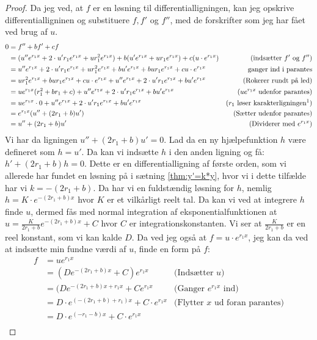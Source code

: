 \begin{proof}
Da jeg ved, at $f$ er en løsning til differentialligningen, kan jeg opskrive differentialligninen og substituere $f, f'$ og $f''$, med de forskrifter som jeg har fået ved brug af $u$. 
\begin{align*}
0 	&= f'' + bf' + cf \\
	&= (u''e^{r_1 x} + 2\cdot u' r_1 e^{r_1 x} + u r_1^2 e^{r_1 x}) + b(u'e^{r_1 x} + ur_1 e^{r_1 x}) + c (u \cdot e^{r_1 x}) &\text{(indsætter $f'$ og $f''$)}\\
	&= u''e^{r_1 x} + 2\cdot u' r_1 e^{r_1 x} + u r_1^2 e^{r_1 x} + bu'e^{r_1 x} + bur_1 e^{r_1 x} + cu \cdot e^{r_1 x}&\text{ganger ind i parantes}\\
	&= u r_1^2 e^{r_1 x} + bur_1 e^{r_1 x} + cu \cdot e^{r_1 x} + u''e^{r_1 x} + 2\cdot u' r_1 e^{r_1 x} + bu'e^{r_1 x}  & \text{(Rokerer rundt på led)}\\
	&= ue^{r_1 x}(r_1^2  + br_1 + c) + u''e^{r_1 x} + 2\cdot u' r_1 e^{r_1 x} + bu'e^{r_1 x} & \text{($ue^{r_1 x}$ udenfor  parantes)}\\
	&= ue^{r_1 x} \cdot 0+ u''e^{r_1 x} + 2\cdot u' r_1 e^{r_1 x} + bu'e^{r_1 x} & \text{($r_1$ løser karakterligningen\footnotemark)}\\
	&= e^{r_1 x} (u'' + (2r_1 + b)u') & \text{(Sætter udenfor parantes)}\\
	&= u'' + (2r_1 + b)u' & \text{(Dividerer med $e^{r_1 x}$)}
\end{align*}
Vi har da ligningen $u'' + (2r_1 + b)u' = 0$. 
Lad da en ny hjælpefunktion $h$ være defineret som $h = u'$. 
Da kan vi indsætte $h$ i den anden ligning og få:
$h' + (2r_1 + b)h = 0$. 
Dette er en differentialligning af første orden, som vi allerede har fundet en løsning på i sætning \ref{thm:y'=k*y}, 
hvor vi i dette tilfælde har vi $k = -(2r_1 + b)$.
Da har vi en fuldstændig løsning for $h$, nemlig $h=K \cdot e^{-(2r_1 + b)x}$ hvor $K$ er et vilkårligt reelt tal. 
Da kan vi ved at integrere $h$ finde $u$, dermed fås med normal integration af eksponentialfunktionen at $u = \frac{K}{2r_1 + b} e^{-(2r_1 + b)x} + C$ hvor $C$ er integrationskonstanten. 
Vi ser at $\frac{K}{2r_1 + b}$ er en reel konstant, som vi kan kalde $D$.
Da ved jeg også at $f=u\cdot e^{r_1 x}$, jeg kan da ved at indsætte min fundne værdi af $u$, finde en form på $f$:
\begin{align*}
f 	&= ue^{r_1 x}\\
	&= (D e^{-(2r_1 + b)x} + C)e^{r_1 x} &\text{(Indsætter $u$)}\\
	&= (D e^{-(2r_1 + b)x + r_1 x} + Ce^{r_1 x} &\text{(Ganger $e^{r_1 x}$ ind)}\\
	&= D \cdot e^{(-(2r_1 + b)+r_1)x} + C\cdot e^{r_1 x}&\text{(Flytter $x$ ud foran parantes)}\\
	&= D \cdot e^{(-r_1 - b)x} + C\cdot e^{r_1 x}\\
\end{align*}


\end{proof}
